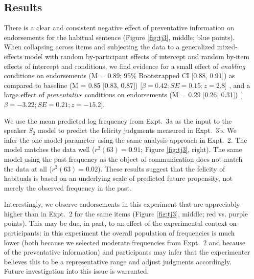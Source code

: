 \documentclass[10pt,letterpaper]{article}
\newcommand{\ndg}[1]{\textcolor{Green}{[ndg: #1]}}
\newcommand{\mht}[1]{\textcolor{DarkOrange}{[mht: #1]}}
\begin{document}
\subsection{Results}

There is a clear and consistent negative effect of preventative information on endorsements for the habitual sentence (Figure \ref{fig:tj3}, middle; blue points).
When collapsing across items and subjecting the data to a generalized mixed-effects model with random by-participant effects of intercept and random by-item effects of intercept and conditions, we find evidence for a small effect of \emph{enabling} conditions on endorsements (M =  0.89; 95\% Bootstrapped CI [0.88, 0.91]) as compared to baseline (M = 0.85 [0.83, 0.87]) [$\beta = 0.42; SE = 0.15; z = 2.8$]%
, and a large effect of \emph{preventative} conditions on endorsements (M = 0.29 [0.26, 0.31]) [$ \beta = -3.22; SE = 0.21; z = -15.2$].%

We use the mean predicted log frequency from Expt.~3a as the input to the speaker $S_2$ model to predict the felicity judgments measured in Expt.~3b.
We infer the one model parameter using the same analysis approach in Expt.~2. 
The model matches the data well ($r^2(63) = 0.91$; Figure \ref{fig:tj3}, right).
The same model using the past frequency as the object of communication does not match the data at all ($r^2(63) = 0.02$).
These results suggest that the felicity of habituals is based on an underlying scale of predicted future propensity, not merely the observed frequency in the past.

Interestingly, we observe endorsements in this experiment that are appreciably higher than in Expt.~2 for the same items (Figure \ref{fig:tj3}, middle; red vs. purple points). 
This may be due, in part, to an effect of the experimental context on participants: 
in this experiment the overall population of frequencies is much lower (both because we selected moderate frequencies from Expt.~2 and because of the preventative information) and participants may infer that the experimenter believes this to be a representative range and adjust judgments accordingly. Future investigation into this issue is warranted.

\end{document}
